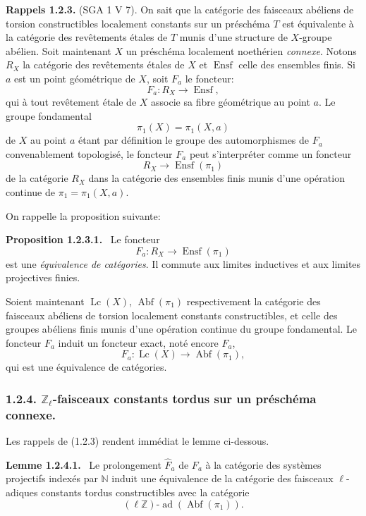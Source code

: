 \documentclass[11pt]{article}
\newenvironment{statement}[1]{\par\medskip\noindent\textbf{#1.}\ }{\par\medskip}
\providecommand{\Ensf}{\operatorname{Ensf}}
\providecommand{\Abf}{\operatorname{Abf}}
\providecommand{\Lc}{\operatorname{Lc}}
\providecommand{\ad}{\operatorname{ad}}
\begin{document}
\textbf{Rappels 1.2.3.} (SGA 1 V 7). On sait que la catégorie des faisceaux abéliens de torsion constructibles localement constants sur un préschéma \(T\) est équivalente à la catégorie des revêtements étales de \(T\) munis d'une structure de \(X\)-groupe abélien. Soit maintenant \(X\) un préschéma localement noethérien \emph{connexe}. Notons \(R_X\) la catégorie des revêtements étales de \(X\) et \(\Ensf\) celle des ensembles finis. Si \(a\) est un point géométrique de \(X\), soit \(F_a\) le foncteur:
\[
F_a:R_X\longrightarrow \Ensf,
\]
qui à
tout revêtement étale de \(X\) associe sa fibre géométrique au point \(a\). Le groupe fondamental
\[
\pi_1(X)=\pi_1(X,a)
\]
de \(X\) au point \(a\) étant par définition le groupe des automorphismes de \(F_a\) convenablement topologisé, le foncteur \(F_a\) peut s'interpréter comme un foncteur
\[
R_X\longrightarrow \Ensf(\pi_1)
\]
de la catégorie \(R_X\) dans la catégorie des ensembles finis munis d'une opération continue de \(\pi_1=\pi_1(X,a)\).

On rappelle la proposition suivante:

\begin{statement}{Proposition 1.2.3.1}
Le foncteur
\[
F_a:R_X\longrightarrow \Ensf(\pi_1)
\]
est une \emph{équivalence de catégories}. Il commute aux limites inductives et aux limites projectives finies.
\end{statement}

Soient maintenant \(\Lc(X)\), \(\Abf(\pi_1)\) respectivement la catégorie des faisceaux abéliens de torsion localement constants constructibles, et celle des groupes abéliens finis munis d'une opération continue du groupe fondamental. Le foncteur \(F_a\) induit un foncteur exact, noté encore \(F_a\),
\[
F_a:\Lc(X)\longrightarrow \Abf(\pi_1),
\]
qui est une équivalence de catégories.

\subsubsection*{1.2.4. \(\mathbb Z_\ell\)-faisceaux constants tordus sur un préschéma connexe.}

Les rappels de (1.2.3) rendent immédiat le lemme ci-dessous.

\begin{statement}{Lemme 1.2.4.1}
Le prolongement \(\widehat F_a\) de \(F_a\) à la catégorie des systèmes projectifs indexés par \(\mathbb N\) induit une équivalence de la catégorie des faisceaux \(\ell\)-adiques constants tordus constructibles avec la catégorie
\[
(\ell\mathbb Z)\text{-}\ad(\Abf(\pi_1)).
\]
\end{statement}
\end{document}

